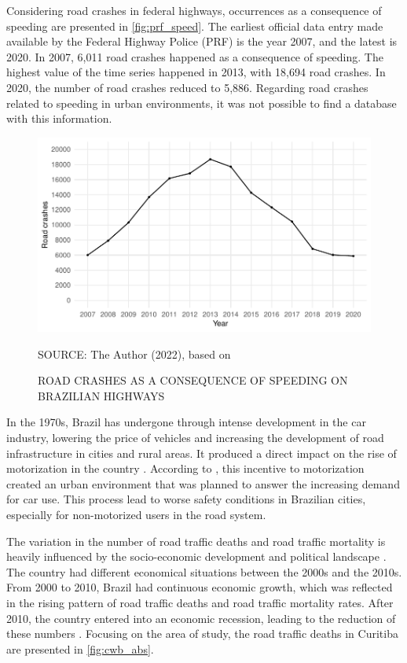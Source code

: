 Considering road crashes in federal highways, occurrences as a consequence of speeding are presented in \autoref{fig:prf_speed}. The earliest official data entry made available by the Federal Highway Police (PRF) is the year 2007, and the latest is 2020. In 2007, 6,011 road crashes happened as a consequence of speeding. The highest value of the time series happened in 2013, with 18,694 road crashes. In 2020, the number of road crashes reduced to 5,886. Regarding road crashes related to speeding in urban environments, it was not possible to find a database with this information. 

\begin{figure}[!htbp]
    \centering\footnotesize
    \captionsetup{font=footnotesize}
    \caption{ROAD CRASHES AS A CONSEQUENCE OF SPEEDING ON BRAZILIAN HIGHWAYS}
    \includegraphics{fig/prf_plot.pdf}
    \label{fig:prf_speed}
    \par SOURCE: The Author (2022), based on \textcite{PRF2021b}
\end{figure}

In the 1970s, Brazil has undergone through intense development in the car industry, lowering the price of vehicles and increasing the development of road infrastructure in cities and rural areas. It produced a direct impact on the rise of motorization in the country \cite{Vasconcellos2013}. According to \textcite{Harvey1982}, this incentive to motorization created an urban environment that was planned to answer the increasing demand for car use. This process lead to worse safety conditions in Brazilian cities, especially for non-motorized users in the road system.   

The variation in the number of road traffic deaths and road traffic mortality is heavily influenced by the socio-economic development and political landscape \cite{Ferraz2012}. The country had different economical situations between the 2000s and the 2010s. From 2000 to 2010, Brazil had continuous economic growth, which was reflected in the rising pattern of road traffic deaths and road traffic mortality rates. After 2010, the country entered into an economic recession, leading to the reduction of these numbers \cite{Bastos2020}. Focusing on the area of study, the road traffic deaths in Curitiba are presented in \autoref{fig:cwb_abs}.   

